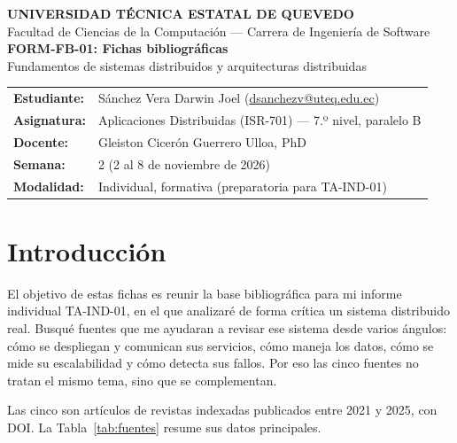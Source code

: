 \documentclass[11pt,a4paper]{article}
\begin{document}
\begin{center}
  {\large\textbf{UNIVERSIDAD TÉCNICA ESTATAL DE QUEVEDO}}\\[2pt]
  Facultad de Ciencias de la Computación --- Carrera de Ingeniería de Software\\[8pt]
  {\Large\textbf{FORM-FB-01: Fichas bibliográficas}}\\[2pt]
  Fundamentos de sistemas distribuidos y arquitecturas distribuidas
\end{center}

\vspace{4pt}
\begin{tabularx}{\textwidth}{@{}lX@{}}
\toprule
\textbf{Estudiante:} & Sánchez Vera Darwin Joel (\href{mailto:dsanchezv@uteq.edu.ec}{dsanchezv@uteq.edu.ec}) \\
\textbf{Asignatura:} & Aplicaciones Distribuidas (ISR-701) --- 7.º nivel, paralelo B \\
\textbf{Docente:} & Gleiston Cicerón Guerrero Ulloa, PhD \\
\textbf{Semana:} & 2 (2 al 8 de noviembre de 2026) \\
\textbf{Modalidad:} & Individual, formativa (preparatoria para TA-IND-01) \\
\bottomrule
\end{tabularx}

\section*{Introducción}

El objetivo de estas fichas es reunir la base bibliográfica para mi informe individual TA-IND-01, en el que analizaré de forma crítica un sistema distribuido real. Busqué fuentes que me ayudaran a revisar ese sistema desde varios ángulos: cómo se despliegan y comunican sus servicios, cómo maneja los datos, cómo se mide su escalabilidad y cómo detecta sus fallos. Por eso las cinco fuentes no tratan el mismo tema, sino que se complementan.

Las cinco son artículos de revistas indexadas publicados entre 2021 y 2025, con DOI. La Tabla~\ref{tab:fuentes} resume sus datos principales.
\end{document}
